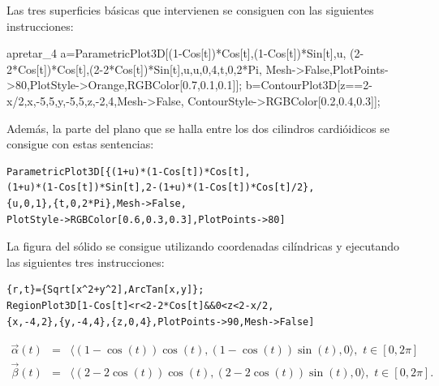 Las tres superficies básicas que intervienen se consiguen con las siguientes instrucciones:

\begin{SaveVerbatim}{apretar_4}
a=ParametricPlot3D[{{(1-Cos[t])*Cos[t],(1-Cos[t])*Sin[t],u},
{(2-2*Cos[t])*Cos[t],(2-2*Cos[t])*Sin[t],u}},{u,0,4},{t,0,2*Pi},
Mesh->False,PlotPoints->80,PlotStyle->{Orange,RGBColor[0.7,0.1,0.1]}];
b=ContourPlot3D[{z==2-x/2},{x,-5,5},{y,-5,5},{z,-2,4},Mesh->False,
ContourStyle->RGBColor[0.2,0.4,0.3]];
\end{SaveVerbatim}

\begin{tcolorbox}[title=\bf Instrucción en \verb"Mathematica"]
\end{tcolorbox}

Además, la parte del plano que se halla entre los dos cilindros cardióidicos se consigue con estas sentencias:

\begin{tcolorbox}[title=\bf Instrucción en \verb"Mathematica"]\begin{Verbatim}[formatcom=\letraverbatim]
ParametricPlot3D[{(1+u)*(1-Cos[t])*Cos[t],
(1+u)*(1-Cos[t])*Sin[t],2-(1+u)*(1-Cos[t])*Cos[t]/2},
{u,0,1},{t,0,2*Pi},Mesh->False,
PlotStyle->RGBColor[0.6,0.3,0.3],PlotPoints->80]
\end{Verbatim}
\end{tcolorbox}

La figura del sólido se consigue utilizando coordenadas cilíndricas y ejecutando las siguientes tres instrucciones:

\begin{tcolorbox}[title=\bf Instrucción en \verb"Mathematica"]\begin{Verbatim}[formatcom=\letraverbatim]
{r,t}={Sqrt[x^2+y^2],ArcTan[x,y]};
RegionPlot3D[1-Cos[t]<r<2-2*Cos[t]&&0<z<2-x/2,
{x,-4,2},{y,-4,4},{z,0,4},PlotPoints->90,Mesh->False]
\end{Verbatim}
\end{tcolorbox}

\begin{eqnarray*}
\overrightarrow{\alpha} (t) &=& \langle(1-\cos(t))\cos(t), (1-\cos(t))\sin(t), 0\rangle ,\,\, t \in[0, 2\pi] \\
\overrightarrow{\beta} (t)& = &\langle(2-2\cos(t))\cos(t), (2-2\cos(t))\sin(t), 0\rangle ,\,\, t \in[0, 2\pi].
\end{eqnarray*}

